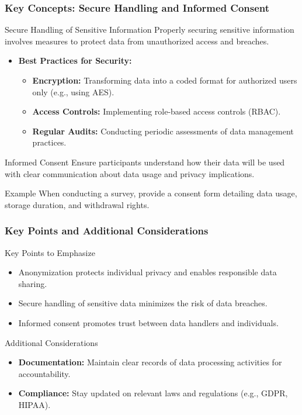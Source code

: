 \documentclass[aspectratio=169]{beamer}
\begin{document}
\begin{frame}[fragile]
    \frametitle{Key Concepts: Secure Handling and Informed Consent}
    \begin{block}{Secure Handling of Sensitive Information}
        Properly securing sensitive information involves measures to protect data from unauthorized access and breaches.
    \end{block}
    \begin{itemize}
        \item \textbf{Best Practices for Security:}
        \begin{itemize}
            \item \textbf{Encryption:} Transforming data into a coded format for authorized users only (e.g., using AES).
            \item \textbf{Access Controls:} Implementing role-based access controls (RBAC).
            \item \textbf{Regular Audits:} Conducting periodic assessments of data management practices.
        \end{itemize}
    \end{itemize}
    \begin{block}{Informed Consent}
        Ensure participants understand how their data will be used with clear communication about data usage and privacy implications.
    \end{block}
    \begin{block}{Example}
        When conducting a survey, provide a consent form detailing data usage, storage duration, and withdrawal rights.
    \end{block}
\end{frame}

\begin{frame}[fragile]
    \frametitle{Key Points and Additional Considerations}
    \begin{block}{Key Points to Emphasize}
        \begin{itemize}
            \item Anonymization protects individual privacy and enables responsible data sharing.
            \item Secure handling of sensitive data minimizes the risk of data breaches.
            \item Informed consent promotes trust between data handlers and individuals.
        \end{itemize}
    \end{block}
    \begin{block}{Additional Considerations}
        \begin{itemize}
            \item \textbf{Documentation:} Maintain clear records of data processing activities for accountability.
            \item \textbf{Compliance:} Stay updated on relevant laws and regulations (e.g., GDPR, HIPAA).
        \end{itemize}
    \end{block}
\end{frame}
\end{document}
